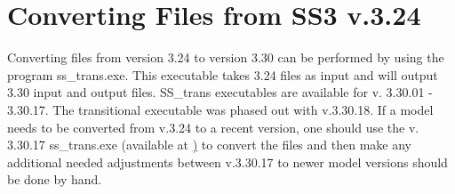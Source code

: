 \hypertarget{ConvIssues}{}
\section{Converting Files from SS3 v.3.24}
Converting files from version 3.24 to version 3.30 can be performed by using the program ss\_trans.exe. This executable takes 3.24 files as input and will output 3.30 input and output files. SS\_trans executables are available for v. 3.30.01 - 3.30.17. The transitional executable was phased out with v.3.30.18. If a model needs to be converted from v.3.24 to a recent version, one should use the v. 3.30.17 ss\_trans.exe (available at \href{https://github.com/nmfs-stock-synthesis/stock-synthesis/releases/tag/v3.30.17}) to convert the files and then make any additional needed adjustments between v.3.30.17 to newer model versions should be done by hand. 

